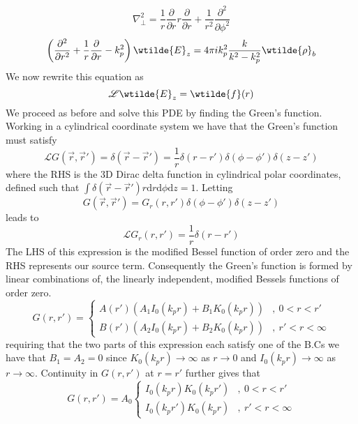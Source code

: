\begin{equation}
\nabla_{\perp}^2=\frac{1}{r}\frac{\partial }{\partial r}r\frac{\partial }{\partial r} +\frac{1}{r^2}\frac{\partial^2 }{\partial \phi^2} 
\end{equation}
\begin{equation}
 \left(\frac{\partial^2 }{\partial r^2}+\frac{1}{r}\frac{\partial }{\partial r} -k^2_p\right)\wtilde{E}_z
=4\pi ik_p^2 \frac{k}{k^2-k_p^2}\wtilde{\rho}_b
\end{equation}
We now rewrite this equation as
\begin{equation}
\mathscr{L}\wtilde{E}_z= \wtilde{f}(r)
\end{equation}
We proceed as before and solve this PDE by finding the Green's function. Working in a cylindrical coordinate system we have that the Green's function must satisfy 
\begin{equation}
\mathscr{L}G(\vec{r},\vec{r}')=\delta(\vec{r}-\vec{r}')=\frac{1}{r}\delta(r-r')\delta(\phi-\phi')\delta(z-z')
\end{equation}
where the RHS is the 3D Dirac delta function in cylindrical polar coordinates, defined such that 
$\int\delta(\vec{r}-\vec{r}')r\mathrm{d}r\mathrm{d}\phi\mathrm{d}z=1$. Letting 
\begin{equation}
G(\vec{r},\vec{r}')=G_r(r,r')\delta(\phi-\phi')\delta(z-z')
\end{equation}
leads to 
\begin{equation}
\mathscr{L}G_r(r,r')=\frac{1}{r}\delta(r-r')
\end{equation}
The LHS of this expression is the modified Bessel function of order zero and the RHS represents our source term. Consequently the Green's function is formed by linear combinations of, the linearly independent, modified Bessels functions of order zero. 
\begin{equation}
G\left(r,r'\right)=\left\{ \begin{array}{ll}
A(r')(A_1 I_0(k_pr)+B_1K_0(k_pr)) &,~ 0<r<r'\\
B(r')(A_2 I_0(k_pr)+B_2K_0(k_pr))  &,~ r'<r<\infty
\end{array}\right.
\end{equation}
requiring that the two parts of this expression each satisfy one of the B.Cs we have that $B_1=A_2=0$ since $K_0(k_pr)\to \infty$ as $r\to 0$ and $I_0(k_pr)\to \infty$ as $r\to \infty$. Continuity in $G(r,r')$ at $r=r'$ further gives that 
\begin{equation}
G\left(r,r'\right)=A_0\left\{ \begin{array}{ll}
I_0(k_pr)K_0(k_pr') &,~ 0<r<r'\\
I_0(k_pr')K_0(k_pr)  &,~ r'<r<\infty
\end{array}\right.
\end{equation}

